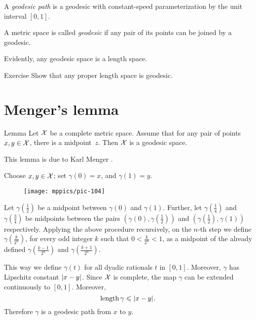 A \emph{geodesic path} is a geodesic with constant-speed parameterization by the unit interval $[0,1]$.

A metric space is called \emph{geodesic} if any pair of its points can be joined by a geodesic.

Evidently, any geodesic space is a length space.

\begin{thm}{Exercise}\label{ex:compact-length}
Show that any proper length space is geodesic.
\end{thm}

\section{Menger's lemma}

\begin{thm}{Lemma}\label{lem:mid>geod}
Let $\mathcal{X}$ be a complete metric space.
Assume that for any pair of points $x,y\in \mathcal{X}$, 
there is a midpoint~$z$.
Then $\mathcal{X}$ is a geodesic space.

\end{thm}

This lemma is due to Karl Menger \cite[Section 6]{menger}.


Choose $x,y\in \mathcal{X}$;
set $\gamma(0)=x$, and $\gamma(1)=y$.

\begin{figure}[ht!]
\vskip-0mm
\centering
\texttt{[image: mppics/pic-104]}
\end{figure}

Let $\gamma(\tfrac12)$ be a midpoint between $\gamma(0)$ and $\gamma(1)$.
Further, let $\gamma(\frac14)$ 
and $\gamma(\frac34)$ be midpoints between the pairs $(\gamma(0),\gamma(\tfrac12))$ 
and $(\gamma(\tfrac12),\gamma(1))$ respectively.
Applying the above procedure recursively,
on the $n$-th step we define $\gamma(\tfrac{k}{2^n})$,
for every odd integer $k$ such that $0<\tfrac k{2^n}<1$, 
as a midpoint of the already defined
$\gamma(\tfrac{k-1}{2^n})$ and $\gamma(\tfrac{k+1}{2^n})$.

This way we define $\gamma(t)$ for all dyadic rationals $t$ in $[0,1]$.
Moreover, $\gamma$ has Lipschitz constant $|{x}-{y}|_{}^{{}}$.
Since $\mathcal{X}$ is complete, the map $\gamma$ can be extended continuously to $[0,1]$.
Moreover,
\[
\mathop{\rm length}\nolimits\gamma\leqslant |{x}-{y}|_{}^{{}}.
\]
Therefore $\gamma$ is a geodesic path from $x$ to $y$.
\qedsf

